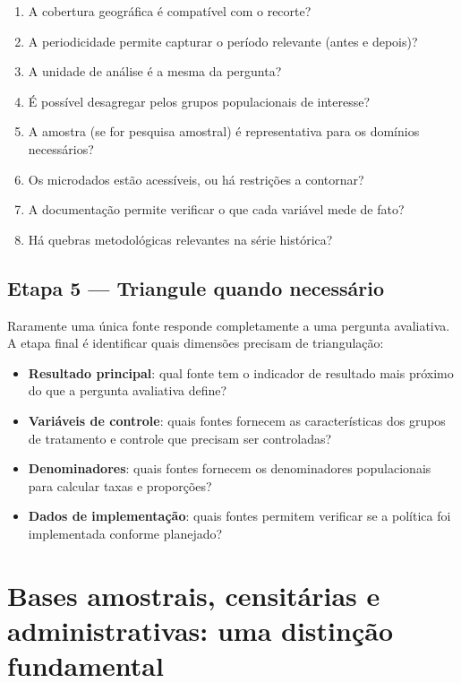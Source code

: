 \begin{enumerate}
  \item A cobertura geográfica é compatível com o recorte?
  \item A periodicidade permite capturar o período relevante (antes e depois)?
  \item A unidade de análise é a mesma da pergunta?
  \item É possível desagregar pelos grupos populacionais de interesse?
  \item A amostra (se for pesquisa amostral) é representativa para os domínios necessários?
  \item Os microdados estão acessíveis, ou há restrições a contornar?
  \item A documentação permite verificar o que cada variável mede de fato?
  \item Há quebras metodológicas relevantes na série histórica?
\end{enumerate}

\subsection{Etapa 5 --- Triangule quando necessário}

Raramente uma única fonte responde completamente a uma pergunta avaliativa. A etapa final é identificar quais dimensões precisam de triangulação:

\begin{itemize}
  \item \textbf{Resultado principal}: qual fonte tem o indicador de resultado mais próximo do que a pergunta avaliativa define?
  \item \textbf{Variáveis de controle}: quais fontes fornecem as características dos grupos de tratamento e controle que precisam ser controladas?
  \item \textbf{Denominadores}: quais fontes fornecem os denominadores populacionais para calcular taxas e proporções?
  \item \textbf{Dados de implementação}: quais fontes permitem verificar se a política foi implementada conforme planejado?
\end{itemize}

\section{Bases amostrais, censitárias e administrativas:
         uma distinção fundamental}

